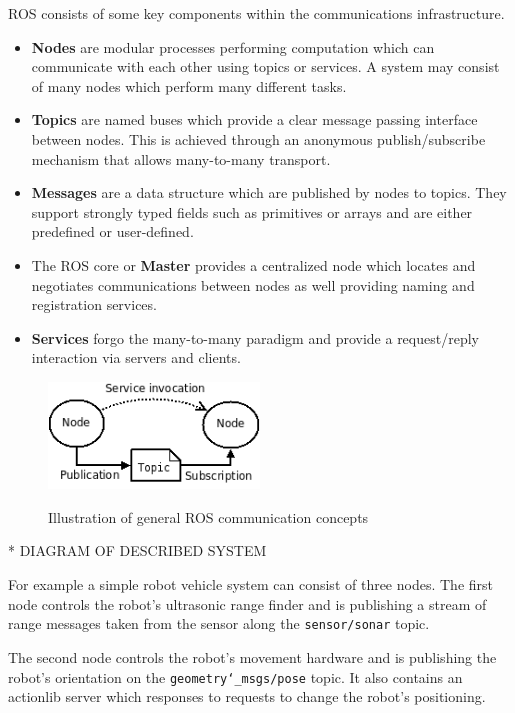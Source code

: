 \documentclass{mproj}
\begin{document}
ROS consists of some key components within the communications infrastructure.
\begin{itemize}
  \item \textbf{Nodes} are modular processes performing computation which can communicate with each other using topics or services. A system may consist of many nodes which perform many different tasks.
  \item \textbf{Topics} are named buses which provide a clear message passing interface between nodes. This is achieved through an anonymous publish/subscribe mechanism that allows many-to-many transport.
  \item \textbf{Messages} are a data structure which are published by nodes to topics. They support strongly typed fields such as primitives or arrays and are either predefined or user-defined.
  \item The ROS core or \textbf{Master} provides a centralized node which locates and negotiates communications between nodes as well providing naming and registration services.
  \item \textbf{Services} forgo the many-to-many paradigm and provide a request/reply interaction via servers and clients.
\end{itemize}

\begin{figure}[h]
  \caption{Illustration of general ROS communication concepts}
  \centering
  \includegraphics[width=0.5\textwidth]{images/ROS_basic_concepts.png}
  \label{fig:ROS diagram}
\end{figure}

* DIAGRAM OF DESCRIBED SYSTEM

For example a simple robot vehicle system can consist of three nodes. The first node controls the robot's ultrasonic range finder and is publishing a stream of range messages taken from the sensor along the \texttt{sensor/sonar} topic.

The second node controls the robot's movement hardware and is publishing the robot's orientation on the \texttt{geometry\char`_msgs/pose} topic. It also contains an actionlib server which responses to requests to change the robot's positioning. 
\end{document}
